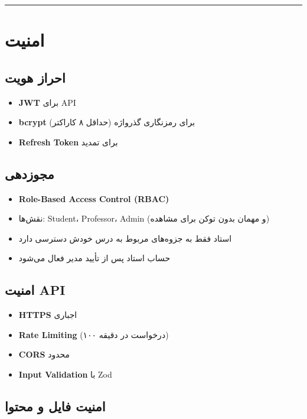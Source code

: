 \documentclass[12pt, a4paper]{article}
\begin{document}
\begin{center}\rule{0.5\linewidth}{0.5pt}\end{center}

\section{امنیت}

\subsection{احراز هویت}

\begin{itemize}
\tightlist
\item
  \textbf{JWT} برای API
\item
  \textbf{bcrypt} برای رمزنگاری گذرواژه (حداقل ۸ کاراکتر)
\item
  \textbf{Refresh Token} برای تمدید
\end{itemize}

\subsection{مجوزدهی}

\begin{itemize}
\tightlist
\item
  \textbf{Role-Based Access Control (RBAC)}
\item
  نقش‌ها: Student، Professor، Admin (و مهمان بدون توکن برای مشاهده)
\item
  استاد فقط به جزوه‌های مربوط به درس خودش دسترسی دارد
\item
  حساب استاد پس از تأیید مدیر فعال می‌شود
\end{itemize}

\subsection{امنیت API}

\begin{itemize}
\tightlist
\item
  \textbf{HTTPS} اجباری
\item
  \textbf{Rate Limiting} (۱۰۰ درخواست در دقیقه)
\item
  \textbf{CORS} محدود
\item
  \textbf{Input Validation} با Zod
\end{itemize}

\subsection{امنیت فایل و محتوا}
\end{document}
